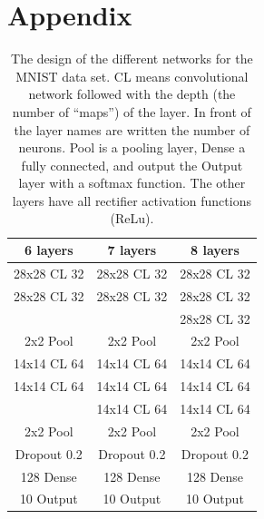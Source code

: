 \documentclass[%
 reprint,
 amsmath,amssymb,
 aps,
]{revtex4-1}
\begin{document}
\section*{Appendix}

\begin{table}
\begin{tabular}{c | c | c}
6 layers & 7 layers & 8 layers  \\ \hline\hline
28x28 CL 32 & 28x28 CL 32 & 28x28 CL 32 \\
28x28 CL 32 & 28x28 CL 32 & 28x28 CL 32 \\
 &   & 28x28 CL 32 \\
2x2 Pool & 2x2 Pool & 2x2 Pool \\
14x14 CL 64 & 14x14 CL 64 & 14x14 CL 64\\
14x14 CL 64 & 14x14 CL 64 & 14x14 CL 64\\
 & 14x14 CL 64 & 14x14 CL 64\\
2x2 Pool & 2x2 Pool  & 2x2 Pool \\
Dropout 0.2 & Dropout 0.2 & Dropout 0.2\\
128 Dense & 128  Dense& 128 Dense\\
10 Output & 10 Output & 10 Output
\end{tabular}
\caption{The design of the different networks for the MNIST data set. CL means convolutional network followed with the depth (the number of ``maps'') of the layer.  In front of the layer names are written the number of neurons. Pool is a pooling layer, Dense a fully connected, and output the Output layer with a softmax function. The other layers have all rectifier activation functions (ReLu).}
\label{tab:mnist_netw}
\end{table}
\end{document}

